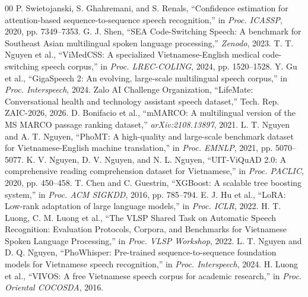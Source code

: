 \documentclass[9pt, conference, a4paper, compsocconf]{IEEEtran}
\begin{document}
\begin{thebibliography}{00}
 P. Swietojanski, S. Ghahremani, and S. Renals, ``Confidence estimation for attention-based sequence-to-sequence speech recognition,'' in \textit{Proc. ICASSP}, 2020, pp. 7349--7353.
 G. J. Shen, ``SEA Code-Switching Speech: A benchmark for Southeast Asian multilingual spoken language processing,'' \textit{Zenodo}, 2023.
 T. T. Nguyen et al., ``ViMedCSS: A specialized Vietnamese-English medical code-switching speech corpus,'' in \textit{Proc. LREC-COLING}, 2024, pp. 1520--1528.
 Y. Gu et al., ``GigaSpeech 2: An evolving, large-scale multilingual speech corpus,'' in \textit{Proc. Interspeech}, 2024.
 Zalo AI Challenge Organization, ``LifeMate: Conversational health and technology assistant speech dataset,'' Tech. Rep. ZAIC-2026, 2026.
 D. Bonifacio et al., ``mMARCO: A multilingual version of the MS MARCO passage ranking dataset,'' \textit{arXiv:2108.13897}, 2021.
 L. T. Nguyen and A. T. Nguyen, ``PhoMT: A high-quality and large-scale benchmark dataset for Vietnamese-English machine translation,'' in \textit{Proc. EMNLP}, 2021, pp. 5070--5077.
 K. V. Nguyen, D. V. Nguyen, and N. L. Nguyen, ``UIT-ViQuAD 2.0: A comprehensive reading comprehension dataset for Vietnamese,'' in \textit{Proc. PACLIC}, 2020, pp. 450--458.
 T. Chen and C. Guestrin, ``XGBoost: A scalable tree boosting system,'' in \textit{Proc. ACM SIGKDD}, 2016, pp. 785--794.
 E. J. Hu et al., ``LoRA: Low-rank adaptation of large language models,'' in \textit{Proc. ICLR}, 2022.
 H. T. Luong, C. M. Luong et al., ``The VLSP Shared Task on Automatic Speech Recognition: Evaluation Protocols, Corpora, and Benchmarks for Vietnamese Spoken Language Processing,'' in \textit{Proc. VLSP Workshop}, 2022.
 L. T. Nguyen and D. Q. Nguyen, ``PhoWhisper: Pre-trained sequence-to-sequence foundation models for Vietnamese speech recognition,'' in \textit{Proc. Interspeech}, 2024.
 H. Luong et al., ``VIVOS: A free Vietnamese speech corpus for academic research,'' in \textit{Proc. Oriental COCOSDA}, 2016.
\end{thebibliography}
\end{document}
